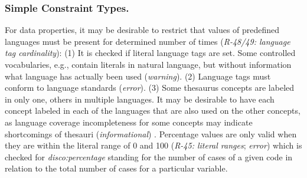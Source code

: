 \documentclass{llncs}
\begin{document}

\subsubsection*{Simple Constraint Types.}

For data properties, it may be desirable to restrict that values of predefined languages must be present for determined number of times (\emph{R-48/49: language tag cardinality}):
(1) It is checked if literal language tags are set. Some controlled vocabularies, e.g., contain literals in natural language, but without information what language has actually been used (\emph{warning}). 
(2) Language tags must conform to language standards (\emph{error}). 
(3) Some thesaurus concepts are labeled in only one, others in multiple languages. 
It may be desirable to have each concept labeled in each of the languages that are also used on the other concepts,
as language coverage incompleteness for some concepts may indicate shortcomings of thesauri (\emph{informational})
\cite{MaderHaslhoferIsaac2012}.
Percentage values are only valid when they are within the literal range of 0 and 100 (\emph{R-45: literal ranges}; \emph{error})
which is checked for \emph{disco:percentage} standing for the number of cases of a given code in relation to the total number of cases for a particular variable.
\end{document}
